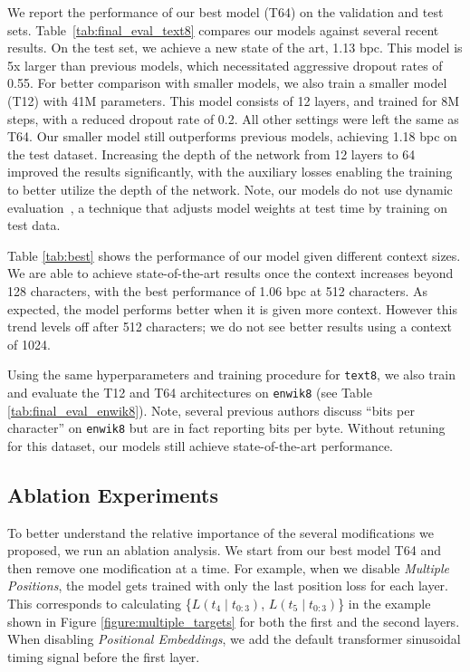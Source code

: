 \documentclass[letterpaper]{article}
\newcommand{\texteight}{\texttt{text8}}
\newcommand{\enwikeight}{\texttt{enwik8}}
\newcommand{\bigmodel}{\textsc{T64}}
\newcommand{\smallmodel}{\textsc{T12}}
\begin{document}
We report the performance of our best model (\bigmodel) on the validation and test sets.
Table~\ref{tab:final_eval_text8} compares our models against several recent results.
On the test set, we achieve a new state of the art, 1.13 bpc.
This model is 5x larger than previous models, which necessitated aggressive dropout rates of 0.55.
For better comparison with smaller models, we also train a smaller model (\smallmodel) with 41M parameters.
This model consists of 12 layers, and trained for 8M steps, with a reduced dropout rate of 0.2.
All other settings were left the same as \bigmodel{}.
Our smaller model still outperforms previous models, achieving 1.18 bpc on the test dataset. Increasing the depth of the network from 12 layers to 64 improved the results significantly, with the auxiliary losses enabling the training to better utilize the depth of the network. Note, our models do not use dynamic evaluation~\cite{krause2017dynamic}, a technique that adjusts model weights at test time by training on test data.



Table \ref{tab:best} shows the performance of our model given different context sizes.
We are able to achieve state-of-the-art results once the context increases beyond 128 characters, with the best performance of 1.06 bpc at 512 characters.
As expected, the model performs better when it is given more context. However this trend levels off after 512 characters; we do not see better results using a context of 1024.



Using the same hyperparameters and training procedure for \texteight{}, we also train and evaluate the \smallmodel{} and \bigmodel{} architectures on \enwikeight{} (see Table \ref{tab:final_eval_enwik8}).
Note, several previous authors discuss ``bits per character'' on \enwikeight{} but are in fact reporting bits per byte.
Without retuning for this dataset, our models still achieve state-of-the-art performance.




\subsection{Ablation Experiments}
\label{section:ablation}

To better understand the relative importance of the several modifications we proposed, we run an ablation analysis.
We start from our best model \bigmodel{} and then remove one modification at a time.
For example, when we disable \emph{Multiple Positions}, the model gets trained with only the last position loss for each layer.
This corresponds to calculating \{$L(t_4\mid t_{0:3})$, $L(t_5\mid t_{0:3})$\} in the example shown in Figure \ref{figure:multiple_targets} for both the first and the second layers.
When disabling \emph{Positional Embeddings}, we add the default transformer sinusoidal timing signal before the first layer.
\end{document}
